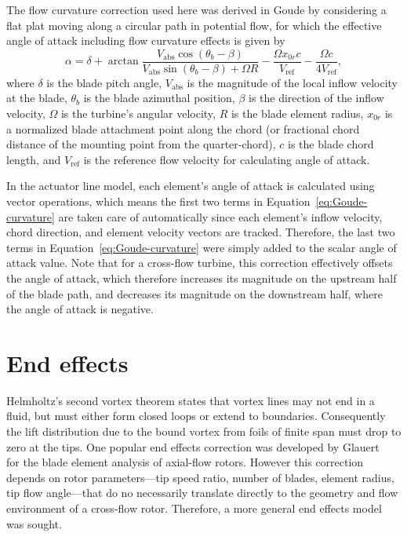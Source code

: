 \documentclass[times]{weauth}
\begin{document}
The flow curvature correction used here was derived in Goude \cite{Goude2012} by
considering a flat plat moving along a circular path in potential flow, for
which the effective angle of attack including flow curvature effects is given by
\begin{equation}
    \alpha = \delta + \arctan \frac{V_\mathrm{abs} \cos(\theta_b -
        \beta)}{V_\mathrm{abs} \sin(\theta_b - \beta) + \Omega R} - \frac{\Omega
        x_{0r}c}{V_\mathrm{ref}} - \frac{\Omega c}{4 V_\mathrm{ref}},
    \label{eq:Goude-curvature}
\end{equation}
where $\delta$ is the blade pitch angle, $V_\mathrm{abs}$ is the magnitude of
the local inflow velocity at the blade, $\theta_b$ is the blade azimuthal
position, $\beta$ is the direction of the inflow velocity, $\Omega$ is the
turbine's angular velocity, $R$ is the blade element radius, $x_{0r}$ is a
normalized blade attachment point along the chord (or fractional chord distance
of the mounting point from the quarter-chord), $c$ is the blade chord length,
and $V_\mathrm{ref}$ is the reference flow velocity for calculating angle of
attack.

In the actuator line model, each element's angle of attack is calculated using
vector operations, which means the first two terms in
Equation~\ref{eq:Goude-curvature} are taken care of automatically since each
element's inflow velocity, chord direction, and element velocity vectors are
tracked. Therefore, the last two terms in Equation~\ref{eq:Goude-curvature} were
simply added to the scalar angle of attack value. Note that for a cross-flow
turbine, this correction effectively offsets the angle of attack, which
therefore increases its magnitude on the upstream half of the blade path, and
decreases its magnitude on the downstream half, where the angle of attack is
negative.


\section{End effects}

Helmholtz's second vortex theorem states that vortex lines may not end in a
fluid, but must either form closed loops or extend to boundaries. Consequently
the lift distribution due to the bound vortex from foils of finite span must
drop to zero at the tips. One popular end effects correction was developed by
Glauert~\cite{Glauert1935} for the blade element analysis of axial-flow rotors.
However this correction depends on rotor parameters---tip speed ratio, number of
blades, element radius, tip flow angle---that do no necessarily translate
directly to the geometry and flow environment of a cross-flow rotor. Therefore,
a more general end effects model was sought.
\end{document}
